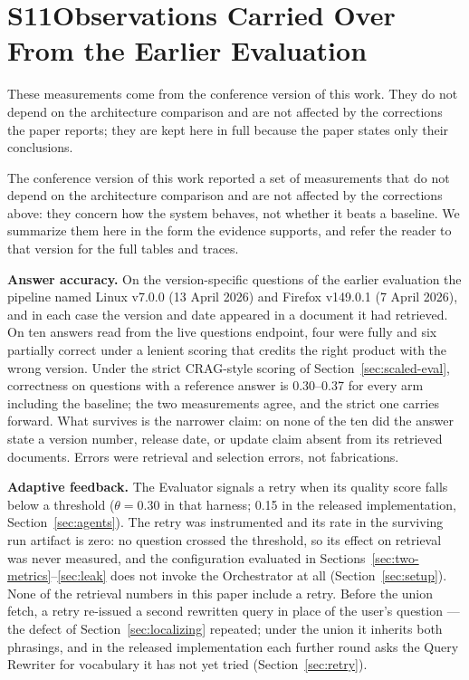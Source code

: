 \documentclass[acmsmall,anonymous,screen]{acmart}
\begin{document}
\section*{S11\quad Observations Carried Over From the Earlier Evaluation}
These measurements come from the conference version of this work. They do not
depend on the architecture comparison and are not affected by the corrections
the paper reports; they are kept here in full because the paper states only
their conclusions.

The conference version of this work reported a set of measurements that do not
depend on the architecture comparison and are not affected by the corrections
above: they concern how the system behaves, not whether it beats a baseline.
We summarize them here in the form the evidence supports, and refer the reader
to that version for the full tables and traces.

\textbf{Answer accuracy.} On the version-specific questions of the earlier
evaluation the pipeline named Linux v7.0.0 (13 April 2026) and Firefox v149.0.1
(7 April 2026), and in each case the version and date appeared in a document it
had retrieved. On ten answers read from the live questions endpoint, four were
fully and six partially correct under a lenient scoring that credits the right
product with the wrong version. Under the strict CRAG-style scoring of
Section~\ref{sec:scaled-eval}, correctness on questions with a reference answer
is 0.30--0.37 for every arm including the baseline; the two measurements agree,
and the strict one carries forward. What survives is the narrower claim: on
none of the ten did the answer state a version number, release date, or update
claim absent from its retrieved documents. Errors were retrieval and selection
errors, not fabrications.

\textbf{Adaptive feedback.} The Evaluator signals a retry when its quality
score falls below a threshold ($\theta=0.30$ in that harness; 0.15 in the
released implementation, Section~\ref{sec:agents}). The retry was instrumented
and its rate in the surviving run artifact is zero: no question crossed the
threshold, so its effect on retrieval was never measured, and the configuration
evaluated in Sections~\ref{sec:two-metrics}--\ref{sec:leak} does not invoke the
Orchestrator at all (Section~\ref{sec:setup}). None of the retrieval numbers in
this paper include a retry. Before the union fetch, a retry re-issued a second
rewritten query in place of the user's question --- the defect of
Section~\ref{sec:localizing} repeated; under the union it inherits both
phrasings, and in the released implementation each further round asks the
Query Rewriter for vocabulary it has not yet tried (Section~\ref{sec:retry}).
\end{document}
